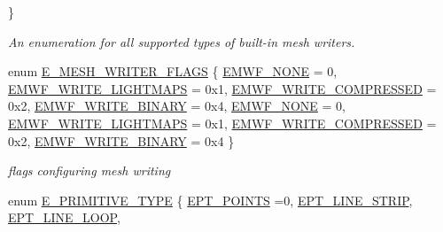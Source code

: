 \begin{DoxyCompactItemize}
 \}\begin{DoxyCompactList}\small\item\em An enumeration for all supported types of built-\/in mesh writers. \end{DoxyCompactList}
\item 
enum \hyperlink{namespaceirr_1_1scene_a9faae6cd9e415a0553cb4cdc190bbc1d}{E\+\_\+\+M\+E\+S\+H\+\_\+\+W\+R\+I\+T\+E\+R\+\_\+\+F\+L\+A\+GS} \{ \newline
\hyperlink{namespaceirr_1_1scene_a9faae6cd9e415a0553cb4cdc190bbc1dac17214e9fb1a903dbe17812feff84656}{E\+M\+W\+F\+\_\+\+N\+O\+NE} = 0, 
\hyperlink{namespaceirr_1_1scene_a9faae6cd9e415a0553cb4cdc190bbc1da70f416a142e420c23b5d06a2015ed2de}{E\+M\+W\+F\+\_\+\+W\+R\+I\+T\+E\+\_\+\+L\+I\+G\+H\+T\+M\+A\+PS} = 0x1, 
\hyperlink{namespaceirr_1_1scene_a9faae6cd9e415a0553cb4cdc190bbc1dafba9935e7fba86cd9699139d326639bf}{E\+M\+W\+F\+\_\+\+W\+R\+I\+T\+E\+\_\+\+C\+O\+M\+P\+R\+E\+S\+S\+ED} = 0x2, 
\hyperlink{namespaceirr_1_1scene_a9faae6cd9e415a0553cb4cdc190bbc1dae1e6480a8fe45c159c72dd696a1b037b}{E\+M\+W\+F\+\_\+\+W\+R\+I\+T\+E\+\_\+\+B\+I\+N\+A\+RY} = 0x4, 
\newline
\hyperlink{namespaceirr_1_1scene_a9faae6cd9e415a0553cb4cdc190bbc1dac17214e9fb1a903dbe17812feff84656}{E\+M\+W\+F\+\_\+\+N\+O\+NE} = 0, 
\hyperlink{namespaceirr_1_1scene_a9faae6cd9e415a0553cb4cdc190bbc1da70f416a142e420c23b5d06a2015ed2de}{E\+M\+W\+F\+\_\+\+W\+R\+I\+T\+E\+\_\+\+L\+I\+G\+H\+T\+M\+A\+PS} = 0x1, 
\hyperlink{namespaceirr_1_1scene_a9faae6cd9e415a0553cb4cdc190bbc1dafba9935e7fba86cd9699139d326639bf}{E\+M\+W\+F\+\_\+\+W\+R\+I\+T\+E\+\_\+\+C\+O\+M\+P\+R\+E\+S\+S\+ED} = 0x2, 
\hyperlink{namespaceirr_1_1scene_a9faae6cd9e415a0553cb4cdc190bbc1dae1e6480a8fe45c159c72dd696a1b037b}{E\+M\+W\+F\+\_\+\+W\+R\+I\+T\+E\+\_\+\+B\+I\+N\+A\+RY} = 0x4
 \}\begin{DoxyCompactList}\small\item\em flags configuring mesh writing \end{DoxyCompactList}
\item 
enum \hyperlink{namespaceirr_1_1scene_a5d7de82f2169761194b2f44d95cdc1dc}{E\+\_\+\+P\+R\+I\+M\+I\+T\+I\+V\+E\+\_\+\+T\+Y\+PE} \{ \newline
\hyperlink{namespaceirr_1_1scene_a5d7de82f2169761194b2f44d95cdc1dca5e2b0eded3443b5eda10da1e16f86e63}{E\+P\+T\+\_\+\+P\+O\+I\+N\+TS} =0, 
\hyperlink{namespaceirr_1_1scene_a5d7de82f2169761194b2f44d95cdc1dca22884c6a70a5245ab6c42b26cdd7511c}{E\+P\+T\+\_\+\+L\+I\+N\+E\+\_\+\+S\+T\+R\+IP}, 
\hyperlink{namespaceirr_1_1scene_a5d7de82f2169761194b2f44d95cdc1dca61ff0dac8234706da27afb0d93a8c342}{E\+P\+T\+\_\+\+L\+I\+N\+E\+\_\+\+L\+O\+OP}, 

\end{DoxyCompactItemize}
